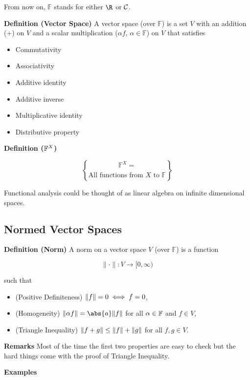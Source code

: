 \documentclass[
]{article}
\begin{document}
From now on, \(\mathbb F\) stands for either \(\R\) or \(\mathcal C\).

\textbf{Definition (Vector Space)} A vector space (over \(\mathbb F\))
is a set \(V\) with an addition (\(+\)) on \(V\) and a scalar
multiplication (\(\alpha f\), \(\alpha \in \mathbb F\)) on \(V\) that
satisfies

\begin{itemize}
\item
  Commutativity
\item
  Associativity
\item
  Additive identity
\item
  Additive inverse
\item
  Multiplicative identity
\item
  Distributive property
\end{itemize}

\textbf{Definition (\(\mathbb F^X\))}

\[\mathbb F^X = \brace{\text{All functions from }X \text{ to }\mathbb F}\]

Functional analysis could be thought of as linear algebra on infinite
dimensional spaces.

\hypertarget{normed-vector-spaces}{%
\subsection{Normed Vector Spaces}\label{normed-vector-spaces}}

\textbf{Definition (Norm)} A norm on a vector space \(V\) (over
\(\mathbb F\)) is a function

\[\|\cdot \|:V\to [0,\infty)\]

such that

\begin{itemize}
\item
  (Positive Definiteness) \(\|{f}\| = 0\iff f = 0\),
\item
  (Homogeneity) \(\norm{\alpha f} = \abs{a}\norm{f}\) for all
  \(\alpha \in \mathbb F\) and \(f\in V\),
\item
  (Triangle Inequality) \(\|{f+g}\|\le \|{f}\|+\|{g}\|\) for all
  \(f,g\in V\).
\end{itemize}

\textbf{Remarks} Most of the time the first two properties are easy to
check but the hard things come with the proof of Triangle Inequality.

\textbf{Examples}
\end{document}
